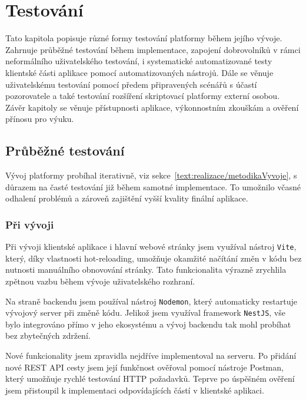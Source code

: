 \chapter{Testování}\label{text:testovani}

\begin{chapterabstract}
Tato kapitola popisuje různé formy testování platformy během jejího vývoje. 
Zahrnuje průběžné testování během implementace, zapojení dobrovolníků v rámci neformálního uživatelského testování, i systematické automatizované testy klientské části aplikace pomocí automatizovaných nástrojů. 
Dále se věnuje uživatelskému testování pomocí předem připravených scénářů s účastí pozorovatele a také testování rozšíření skriptovací platformy externí osobou. 
Závěr kapitoly se věnuje přístupnosti aplikace, výkonnostním zkouškám a ověření přínosu pro výuku.
\end{chapterabstract}

\section{Průběžné testování}\label{text:testovani/prubezne}

Vývoj platformy probíhal iterativně, viz sekce~\ref{text:realizace/metodikaVyvoje}, s důrazem na časté testování již během samotné implementace.
To umožnilo včasné odhalení problémů a zároveň zajištění vyšší kvality finální aplikace.

\subsection{Při vývoji}

Při vývoji klientské aplikace i hlavní webové stránky jsem využíval nástroj \texttt{Vite}, který, díky vlastnosti hot-reloading, umožňuje okamžité načítání změn v kódu bez nutnosti manuálního obnovování stránky.
Tato funkcionalita výrazně zrychlila zpětnou vazbu během vývoje uživatelského rozhraní.

Na straně backendu jsem používal nástroj \texttt{Nodemon}, který automaticky restartuje vývojový server při změně kódu. 
Jelikož jsem využíval framework \texttt{NestJS}, vše bylo integrováno přímo v jeho ekosystému a vývoj backendu tak mohl probíhat bez zbytečných zdržení.

Nové funkcionality jsem zpravidla nejdříve implementoval na serveru.
Po přidání nové REST API cesty jsem její funkčnost ověřoval pomocí nástroje Postman, který umožňuje rychlé testování HTTP požadavků.
Teprve po úspěšném ověření jsem přistoupil k implementaci odpovídajících částí v klientské aplikaci.

